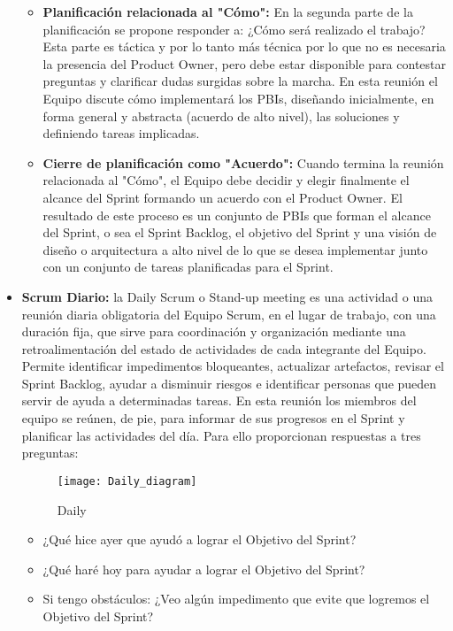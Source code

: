 \begin{itemize}
\begin{itemize}
\item \textbf{Planificación relacionada al "Cómo":} En la segunda parte de la planificación se propone responder a: ¿Cómo será realizado el trabajo? Esta parte es táctica y por lo tanto más técnica por lo que no es necesaria la presencia del Product Owner, pero debe estar disponible para contestar preguntas y clarificar dudas surgidas sobre la marcha. En esta reunión el Equipo discute cómo implementará los PBIs, diseñando inicialmente, en forma general y abstracta (acuerdo de alto nivel), las soluciones y definiendo tareas implicadas. 

\item \textbf{Cierre de planificación como "Acuerdo":} Cuando termina la reunión relacionada al "Cómo", el Equipo debe decidir y elegir finalmente el alcance del Sprint formando un acuerdo con el Product Owner. El resultado de este proceso es un conjunto de PBIs que forman el alcance del Sprint, o sea el Sprint Backlog, el objetivo del Sprint y una visión de diseño o arquitectura a alto nivel de lo que se desea implementar junto con un conjunto de tareas planificadas para el Sprint.

\end{itemize}

\item \textbf{Scrum Diario:} la Daily Scrum o Stand-up meeting es una actividad o una reunión diaria obligatoria del Equipo Scrum, en el lugar de trabajo, con una duración fija, que sirve para coordinación y organización mediante una retroalimentación del estado de actividades de cada integrante del Equipo. Permite identificar impedimentos bloqueantes, actualizar artefactos, revisar el Sprint Backlog, ayudar a disminuir riesgos e identificar personas que pueden servir de ayuda a determinadas tareas. En esta reunión los miembros del equipo se reúnen, de pie, para informar de sus progresos en el Sprint y planificar las actividades del día. Para ello proporcionan respuestas a tres preguntas:

\begin{figure}[h]
  \centering
  \texttt{[image: Daily\_diagram]}
  \caption{Daily}
  \centering
  \label{fig:Daily_diagram} %
\end{figure}
\FloatBarrier

\begin{itemize}
\item{¿Qué hice ayer que ayudó a lograr el Objetivo del Sprint?}
\item{¿Qué haré hoy para ayudar a lograr el Objetivo del Sprint?}
\item{Si tengo obstáculos: ¿Veo algún impedimento que evite que logremos el Objetivo del Sprint?}
\end{itemize}


\end{itemize}
